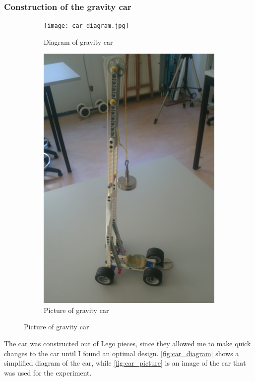 \documentclass[titlepage,12pt]{article}
\begin{document}
        \subsubsection{Construction of the gravity car}
        \begin{figure}[H]
            \hspace*{-1.3in}
            \begin{subfigure}{.5\paperwidth}
                \centering
                \texttt{[image: car\_diagram.jpg]}
                \caption{Diagram of gravity car}
                \label{fig:car_diagram}
            \end{subfigure}%
            \begin{subfigure}{.5\paperwidth}
                \centering
                \includegraphics[width=.5\linewidth]{photo_overview.jpg}
                \caption{Picture of gravity car}
                \label{fig:car_picture}
            \end{subfigure}
        \end{figure}
        The car was constructed out of Lego pieces, since they allowed me to make quick
        changes to the car until I found an optimal design. \autoref{fig:car_diagram} shows
        a simplified diagram of the car, while \autoref{fig:car_picture} is an image of the
        car that was used for the experiment.
            
\end{document}
